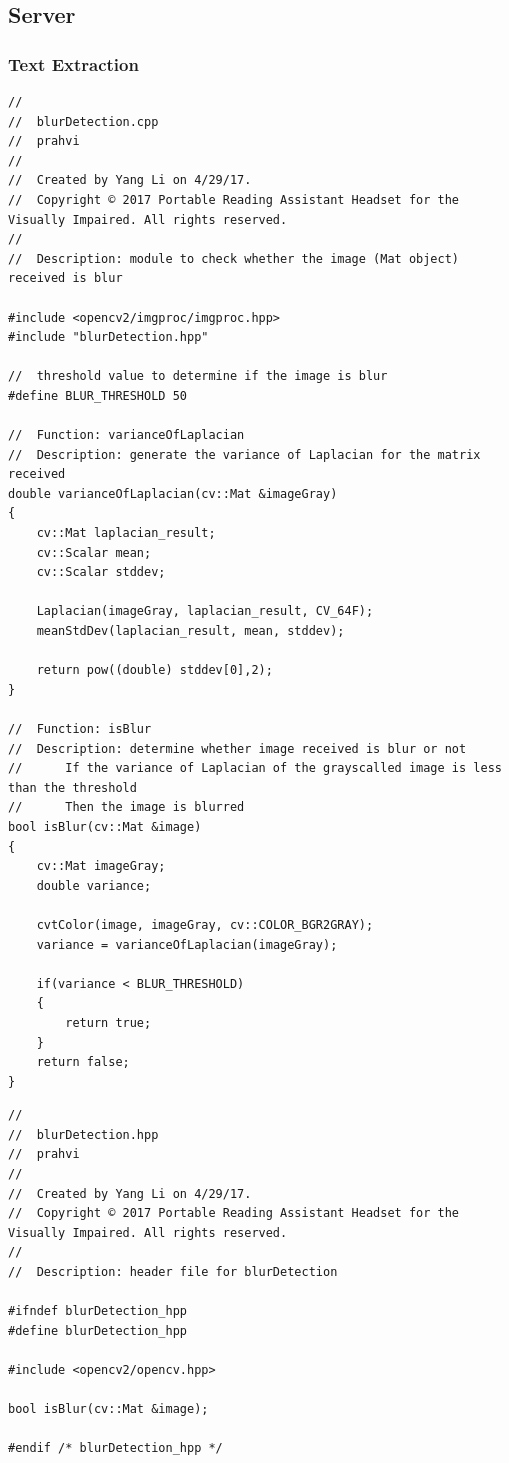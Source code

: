 \subsection{Server}

\subsubsection{Text Extraction}
\begin{lstlisting}
//
//  blurDetection.cpp
//  prahvi
//
//  Created by Yang Li on 4/29/17.
//  Copyright © 2017 Portable Reading Assistant Headset for the Visually Impaired. All rights reserved.
//
//	Description: module to check whether the image (Mat object) received is blur

#include <opencv2/imgproc/imgproc.hpp>
#include "blurDetection.hpp"

//	threshold value to determine if the image is blur
#define BLUR_THRESHOLD 50

//	Function: varianceOfLaplacian
//	Description: generate the variance of Laplacian for the matrix received
double varianceOfLaplacian(cv::Mat &imageGray)
{
	cv::Mat laplacian_result;
	cv::Scalar mean;
	cv::Scalar stddev;
	
	Laplacian(imageGray, laplacian_result, CV_64F);
	meanStdDev(laplacian_result, mean, stddev);
	
	return pow((double) stddev[0],2);
}

//	Function: isBlur
//	Description: determine whether image received is blur or not
//		If the variance of Laplacian of the grayscalled image is less than the threshold
//		Then the image is blurred
bool isBlur(cv::Mat &image)
{
	cv::Mat imageGray;
	double variance;
	
	cvtColor(image, imageGray, cv::COLOR_BGR2GRAY);
	variance = varianceOfLaplacian(imageGray);
	
	if(variance < BLUR_THRESHOLD)
	{
		return true;
	}
	return false;
}
\end{lstlisting}

\begin{lstlisting}
//
//  blurDetection.hpp
//  prahvi
//
//  Created by Yang Li on 4/29/17.
//  Copyright © 2017 Portable Reading Assistant Headset for the Visually Impaired. All rights reserved.
//
//	Description: header file for blurDetection

#ifndef blurDetection_hpp
#define blurDetection_hpp

#include <opencv2/opencv.hpp>

bool isBlur(cv::Mat &image);

#endif /* blurDetection_hpp */

\end{lstlisting}


